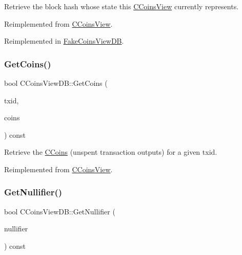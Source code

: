 Retrieve the block hash whose state this \mbox{\hyperlink{class_c_coins_view}{C\+Coins\+View}} currently represents. 



Reimplemented from \mbox{\hyperlink{class_c_coins_view_af81f2907d360a2548d59a61388e5e5cb}{C\+Coins\+View}}.



Reimplemented in \mbox{\hyperlink{class_fake_coins_view_d_b_a36231d924114fbe51a830c9c235c50ad}{Fake\+Coins\+View\+DB}}.

\mbox{\label{class_c_coins_view_d_b_ac35a80d1115ec697101d382e71db5b31}} 
\subsubsection{\texorpdfstring{Get\+Coins()}{GetCoins()}}
{\footnotesize\ttfamily bool C\+Coins\+View\+D\+B\+::\+Get\+Coins (\begin{DoxyParamCaption}\item[{const \mbox{\hyperlink{classuint256}{uint256}} \&}]{txid,  }\item[{\mbox{\hyperlink{class_c_coins}{C\+Coins}} \&}]{coins }\end{DoxyParamCaption}) const\hspace{0.3cm}{\ttfamily [virtual]}}



Retrieve the \mbox{\hyperlink{class_c_coins}{C\+Coins}} (unspent transaction outputs) for a given txid. 



Reimplemented from \mbox{\hyperlink{class_c_coins_view_a67d865358127bef1f0011a23d5158a9f}{C\+Coins\+View}}.

\mbox{\label{class_c_coins_view_d_b_ac9724829164f5a06b6d7c610da03a730}} 
\subsubsection{\texorpdfstring{Get\+Nullifier()}{GetNullifier()}}
{\footnotesize\ttfamily bool C\+Coins\+View\+D\+B\+::\+Get\+Nullifier (\begin{DoxyParamCaption}\item[{const \mbox{\hyperlink{classuint256}{uint256}} \&}]{nullifier }\end{DoxyParamCaption}) const\hspace{0.3cm}{\ttfamily [virtual]}}



